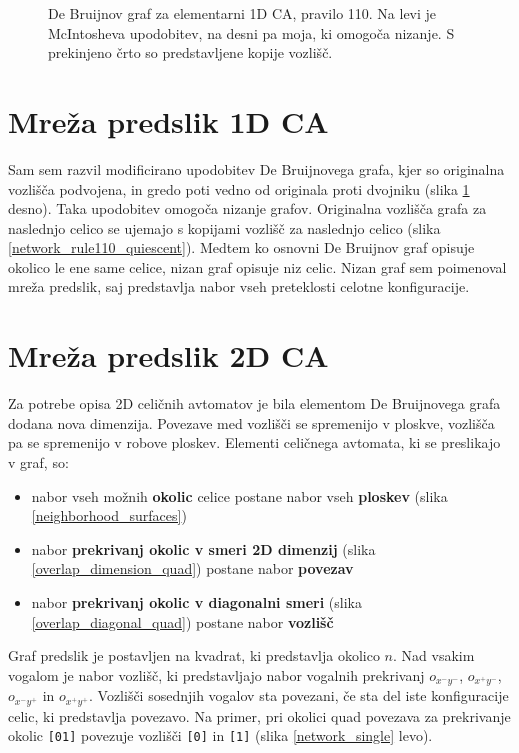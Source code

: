 \documentclass[12pt,a4paper,openany,twoside]{book}
\begin{document}
\begin{figure}[htb]
\centerline{}
\caption[De Bruijnov graf, pravilo 110.]
{De Bruijnov graf za elementarni 1D CA, pravilo 110.
Na levi je McIntosheva upodobitev, na desni pa moja, ki omogoča nizanje.
S prekinjeno črto so predstavljene kopije vozlišč.}
\label{de_bruijn_diagram}
\end{figure}

\section{Mreža predslik 1D CA}

Sam sem razvil \cite{JerasDobnikar2007} modificirano upodobitev De Bruijnovega grafa,
kjer so originalna vozlišča podvojena,
in gredo poti vedno od originala proti dvojniku (slika \ref{de_bruijn_diagram} desno).
Taka upodobitev omogoča nizanje grafov.
Originalna vozlišča grafa za naslednjo celico se
ujemajo s kopijami vozlišč za naslednjo celico (slika \ref{network_rule110_quiescent}).
Medtem ko osnovni De Bruijnov graf opisuje okolico le ene same celice,
nizan graf opisuje niz celic.
Nizan graf sem poimenoval mreža predslik,
saj predstavlja nabor vseh preteklosti celotne konfiguracije.

\section{Mreža predslik 2D CA}

Za potrebe opisa 2D celičnih avtomatov je bila elementom
De Bruijnovega grafa dodana nova dimenzija. Povezave med vozlišči se spremenijo
v ploskve, vozlišča pa se spremenijo v robove ploskev.
Elementi celičnega avtomata, ki se preslikajo v graf, so:
\begin{itemize}[noitemsep,nolistsep]
\item nabor vseh možnih \textbf{okolic} celice postane nabor vseh \textbf{ploskev} (slika \ref{neighborhood_surfaces})
\item nabor \textbf{prekrivanj okolic v smeri 2D dimenzij} (slika \ref{overlap_dimension_quad}) postane nabor \textbf{povezav}
\item nabor \textbf{prekrivanj okolic v diagonalni smeri} (slika \ref{overlap_diagonal_quad}) postane nabor \textbf{vozlišč}
\end{itemize}

Graf predslik je postavljen na kvadrat, ki predstavlja okolico \(n\).
Nad vsakim vogalom je nabor vozlišč, ki predstavljajo nabor vogalnih prekrivanj
\(o_{{x^-}{y^-}}\), \(o_{{x^+}{y^-}}\), \(o_{{x^-}{y^+}}\) in \(o_{{x^+}{y^+}}\).
Vozlišči sosednjih vogalov sta povezani, če sta del iste konfiguracije celic,
ki predstavlja povezavo. Na primer, pri okolici quad povezava za prekrivanje okolic \verb|[01]|
povezuje vozlišči \verb|[0]| in \verb|[1]| (slika \ref{network_single} levo).
\end{document}
